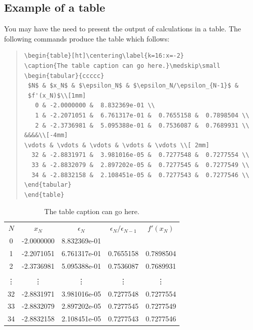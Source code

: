 
\subsection{Example of a table}

You may have the need to present the output of calculations in a
table. The following commands produce the table which follows:
\begin{quote}
\begin{verbatim}
\begin{table}[ht]\centering\label{k=16:x=-2}
\caption{The table caption can go here.}\medskip\small
\begin{tabular}{ccccc}
 $N$ & $x_N$ & $\epsilon_N$ & $\epsilon_N/\epsilon_{N-1}$ &
 $f'(x_N)$\\[1mm]
   0 & -2.0000000 &  8.832369e-01 \\
   1 & -2.2071051 &  6.761317e-01 &  0.7655158 &  0.7898504 \\
   2 & -2.3736981 &  5.095388e-01 &  0.7536087 &  0.7689931 \\
&&&&\\[-4mm]
\vdots & \vdots & \vdots & \vdots & \vdots \\[ 2mm]
  32 & -2.8831971 &  3.981016e-05 &  0.7277548 &  0.7277554 \\
  33 & -2.8832079 &  2.897202e-05 &  0.7277545 &  0.7277549 \\
  34 & -2.8832158 &  2.108451e-05 &  0.7277543 &  0.7277546 \\
\end{tabular}
\end{table}
\end{verbatim}
\end{quote}
\begin{table}[ht]\centering\label{k=16:x=-2}
\caption{The table caption can go here.}\medskip\small
\begin{tabular}{ccccc}
 $N$ & $x_N$ & $\epsilon_N$ & $\epsilon_N/\epsilon_{N-1}$ &
 $f'(x_N)$\\[1mm]
   0 & -2.0000000 &  8.832369e-01 \\
   1 & -2.2071051 &  6.761317e-01 &  0.7655158 &  0.7898504 \\
   2 & -2.3736981 &  5.095388e-01 &  0.7536087 &  0.7689931 \\
&&&&\\[-4mm]
\vdots & \vdots & \vdots & \vdots & \vdots \\[ 2mm]
  32 & -2.8831971 &  3.981016e-05 &  0.7277548 &  0.7277554 \\
  33 & -2.8832079 &  2.897202e-05 &  0.7277545 &  0.7277549 \\
  34 & -2.8832158 &  2.108451e-05 &  0.7277543 &  0.7277546 \\
\end{tabular}
\end{table}
